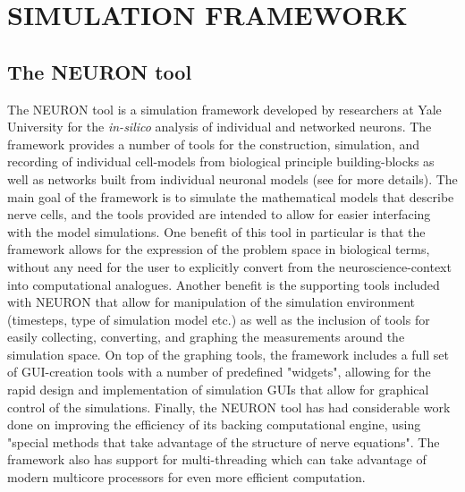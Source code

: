 \documentclass[letterpaper, 10 pt, conference]{ieeeconf}  %
\begin{document}
\section{SIMULATION FRAMEWORK}
\subsection*{The NEURON tool}
The NEURON tool is a simulation framework developed by researchers at Yale University for the \emph{in-silico} analysis of individual and networked neurons. The framework provides a number of tools for the construction, simulation, and recording of individual cell-models from biological principle building-blocks as well as networks built from individual neuronal models (see \cite{neuronSimEnv} for more details). The main goal of the framework is to simulate the mathematical models that describe nerve cells, and the tools provided are intended to allow for easier interfacing with the model simulations. One benefit of this tool in particular is that the framework allows for the expression of the problem space in biological terms, without any need for the user to explicitly convert from the neuroscience-context into computational analogues. Another benefit is the supporting tools included with NEURON that allow for manipulation of the simulation environment (timesteps, type of simulation model etc.) as well as the inclusion of tools for easily collecting, converting, and graphing the measurements around the simulation space. On top of the graphing tools, the framework includes a full set of GUI-creation tools with a number of predefined "widgets", allowing for the rapid design and implementation of simulation GUIs that allow for graphical control of the simulations. Finally, the NEURON tool has had considerable work done on improving the efficiency of its backing computational engine, using "special methods that take advantage of the structure of nerve equations". The framework also has support for multi-threading which can take advantage of modern multicore processors for even more efficient computation.
\end{document}
